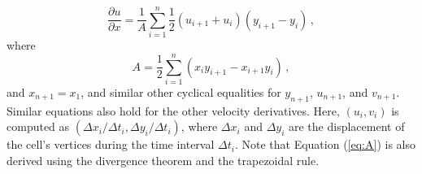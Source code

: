 \documentclass{article}
\begin{document}
    \begin{equation}
        \frac{\partial u}{\partial x}  = \frac{1}{A}\sum_{i=1}^{n}\frac{1}{2}\left( u_{i+1} + u_{i} \right)\left( y_{i+1} - y_{i} \right) \, ,
        \label{eq:dudx_sum}
    \end{equation}
    where
    \begin{equation}
        A = \frac{1}{2}\sum_{i=1}^{n}\left( x_{i}y_{i+1} -  x_{i+1}y_{i} \right)\, ,
        \label{eq:A}
    \end{equation}
    and $x_{n+1} = x_1$, and similar other cyclical equalities for $y_{n+1}$, $u_{n+1}$, and $v_{n+1}$. Similar equations also hold for the other velocity derivatives. Here, $(u_{i},v_{i})$ is computed as $(\Delta x_{i}/\Delta t_{i}, \Delta y_{i}/\Delta t_{i})$, where $\Delta x_{i}$ and $\Delta y_{i}$ are the displacement of the cell's vertices during the time interval $\Delta t_{i}$. Note that Equation (\ref{eq:A}) is also derived using the divergence theorem and the trapezoidal rule.




\end{document}
